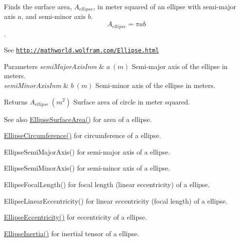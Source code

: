 Finds the surface area, $A_{ellipse}$, in meter squared of an ellipse with semi-\/major axis $a$, and semi-\/minor axis $b$. \[ A_{ellipse}=\pi a b \]. 

See \href{http://mathworld.wolfram.com/Ellipse.html}{\tt http\+://mathworld.\+wolfram.\+com/\+Ellipse.\+html}


\begin{DoxyParams}{Parameters}
{\em semi\+Major\+Axis\+Inm} & $ a\ (m)$ Semi-\/major axis of the ellipse in meters. \\
\hline
{\em semi\+Minor\+Axis\+Inm} & $ b\ (m)$ Semi-\/minor axis of the ellipse in meters. \\
\hline
\end{DoxyParams}
\begin{DoxyReturn}{Returns}
$ A_{ellipse}\ (m^2)$ Surface area of circle in meter squared. 
\end{DoxyReturn}
\begin{DoxySeeAlso}{See also}
\mbox{\hyperlink{group___e_g_x_math-_geometry-2_d-_ellipse-_surface_area_ga4ce8c8323e9718ce5458f4ab7f6d823d}{Ellipse\+Surface\+Area()}} for area of a ellipse. 

\mbox{\hyperlink{group___e_g_x_math-_geometry-2_d-_ellipse-_circumference_ga4172802ac674eb53467b44928ac635c7}{Ellipse\+Circumference()}} for circumference of a ellipse. 

Ellipse\+Semi\+Major\+Axis() for semi-\/major axis of a ellipse. 

Ellipse\+Semi\+Minor\+Axis() for semi-\/minor axis of a ellipse. 

Ellipse\+Focal\+Length() for focal length (linear eccentricity) of a ellipse. 

Ellipse\+Linear\+Eccentricity() for linear eccentricity (focal length) of a ellipse. 

\mbox{\hyperlink{group___e_g_x_math-_geometry-2_d-_ellipse-_eccentricity_ga6a0a7fba17f782616894cfc447628c33}{Ellipse\+Eccentricity()}} for eccentricity of a ellipse. 

\mbox{\hyperlink{group___e_g_x_math-_geometry-2_d-_ellipse-_inertia_ga10a3049c2f04b50f271fb01dc62e4cf8}{Ellipse\+Inertia()}} for inertial tensor of a ellipse. 
\end{DoxySeeAlso}

